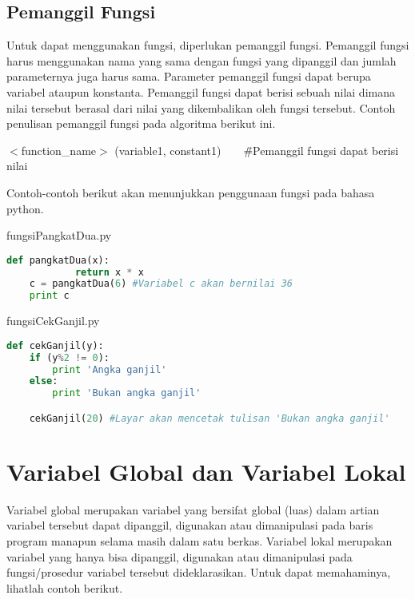 \subsection{Pemanggil Fungsi}
Untuk dapat menggunakan fungsi, diperlukan pemanggil fungsi. Pemanggil fungsi harus menggunakan nama yang sama dengan fungsi yang dipanggil dan jumlah parameternya juga harus sama. Parameter pemanggil fungsi dapat berupa variabel ataupun konstanta. Pemanggil fungsi dapat berisi sebuah nilai dimana nilai tersebut berasal dari nilai yang dikembalikan oleh fungsi tersebut. Contoh penulisan pemanggil fungsi pada algoritma berikut ini.

\begin{tabbing}
$<$function\_name$>$ (variable1, constant1)~~~~\=\#Pemanggil fungsi dapat berisi nilai\\
\end{tabbing}

Contoh-contoh berikut akan menunjukkan penggunaan fungsi pada bahasa python.

\begin{listprog}{fungsiPangkatDua.py}
	\label{lst:fungsiPangkatDua}
	\begin{lstlisting}[language=Python]
	def pangkatDua(x):
			return x * x
	c = pangkatDua(6) #Variabel c akan bernilai 36
	print c
	\end{lstlisting}
\end{listprog}

\begin{listprog}{fungsiCekGanjil.py}
	\label{lst:fungsiCekGanjil}
	\begin{lstlisting}[language=Python]
	def cekGanjil(y):
    if (y%2 != 0):
        print 'Angka ganjil'
    else:
        print 'Bukan angka ganjil'

	cekGanjil(20) #Layar akan mencetak tulisan 'Bukan angka ganjil'
	\end{lstlisting}
\end{listprog}

\section{Variabel Global dan Variabel Lokal}

Variabel global merupakan variabel yang bersifat global (luas) dalam artian variabel tersebut dapat dipanggil, digunakan atau dimanipulasi pada baris program manapun selama masih dalam satu berkas. Variabel lokal merupakan variabel yang hanya bisa dipanggil, digunakan atau dimanipulasi pada fungsi/prosedur variabel tersebut dideklarasikan. Untuk dapat memahaminya, lihatlah contoh berikut.

